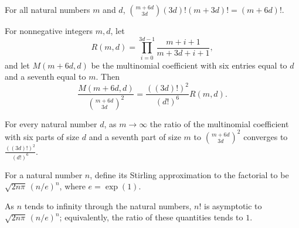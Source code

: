\begin{theorem}
\label{FABL.choose_three_mul_shift_mul_factorials}
\leanok
{}
For all natural numbers $m$ and $d$, $\binom{m+6d}{3d}(3d)!(m+3d)!=(m+6d)!$.
\end{theorem}

\begin{theorem}
\label{FABL.exercise9_3_ratio_shift_eq}
\leanok
{}
For nonnegative integers $m,d$, let
\[
R(m,d)=\prod_{i=0}^{3d-1}\frac{m+i+1}{m+3d+i+1},
\]
and let $M(m+6d,d)$ be the multinomial coefficient with six entries equal to $d$ and a
seventh equal to $m$. Then
\[
\frac{M(m+6d,d)}{\binom{m+6d}{3d}^{2}}=\frac{((3d)!)^2}{(d!)^6}R(m,d).
\]
\end{theorem}

\begin{theorem}
\label{FABL.tendsto_exercise9_3_multinomial_ratio}
\leanok
{}
For every natural number $d$, as $m\to\infty$ the ratio of the multinomial coefficient
with six parts of size $d$ and a seventh part of size $m$ to $\binom{m+6d}{3d}^2$
converges to $\frac{((3d)!)^2}{(d!)^6}$.
\end{theorem}

\begin{definition}
\label{FABL.factorialStirlingApprox}
\leanok
For a natural number $n$, define its Stirling approximation to the factorial to be
$\sqrt{2n\pi}\,(n/e)^n$, where $e=\exp(1)$.
\end{definition}

\begin{theorem}
\label{FABL.factorial_isEquivalent_factorialStirlingApprox}
\leanok
{}
As $n$ tends to infinity through the natural numbers, $n!$ is asymptotic to
$\sqrt{2n\pi}\,(n/e)^n$; equivalently, the ratio of these quantities tends to $1$.
\end{theorem}

